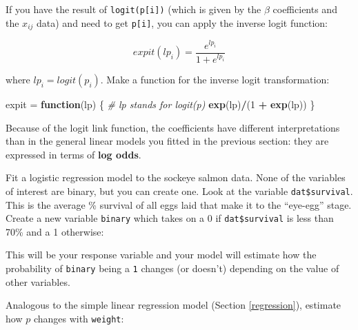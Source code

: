 \documentclass[]{book}
\newenvironment{Shaded}{\begin{snugshade}}{\end{snugshade}}
\newcommand{\KeywordTok}[1]{\textcolor[rgb]{0.13,0.29,0.53}{\textbf{#1}}}
\newcommand{\DecValTok}[1]{\textcolor[rgb]{0.00,0.00,0.81}{#1}}
\newcommand{\StringTok}[1]{\textcolor[rgb]{0.31,0.60,0.02}{#1}}
\newcommand{\CommentTok}[1]{\textcolor[rgb]{0.56,0.35,0.01}{\textit{#1}}}
\newcommand{\ControlFlowTok}[1]{\textcolor[rgb]{0.13,0.29,0.53}{\textbf{#1}}}
\newcommand{\OperatorTok}[1]{\textcolor[rgb]{0.81,0.36,0.00}{\textbf{#1}}}
\newcommand{\NormalTok}[1]{#1}
\theoremstyle{definition}
\theoremstyle{definition}
\theoremstyle{definition}
\theoremstyle{remark}
\begin{document}
If you have the result of \texttt{logit(p{[}i{]})} (which is given by
the \(\beta\) coefficients and the \(x_{ij}\) data) and need to get
\texttt{p{[}i{]}}, you can apply the inverse logit function:

\begin{equation}
  expit(lp_i)=\frac{e^{lp_i}}{1 + e^{lp_i}}
\label{eq:expit}
\end{equation}

where \(lp_i = logit(p_i)\). Make a function for the inverse logit
transformation:

\begin{Shaded}
\begin{Highlighting}[]
\NormalTok{expit =}\StringTok{ }\ControlFlowTok{function}\NormalTok{(lp) \{  }\CommentTok{# lp stands for logit(p)}
  \KeywordTok{exp}\NormalTok{(lp)}\OperatorTok{/}\NormalTok{(}\DecValTok{1} \OperatorTok{+}\StringTok{ }\KeywordTok{exp}\NormalTok{(lp))}
\NormalTok{\}}
\end{Highlighting}
\end{Shaded}

Because of the logit link function, the coefficients have different
interpretations than in the general linear models you fitted in the
previous section: they are expressed in terms of \textbf{log odds}.

Fit a logistic regression model to the sockeye salmon data. None of the
variables of interest are binary, but you can create one. Look at the
variable \texttt{dat\$survival}. This is the average \% survival of all
eggs laid that make it to the ``eye-egg'' stage. Create a new variable
\texttt{binary} which takes on a 0 if \texttt{dat\$survival} is less
than 70\% and a 1 otherwise:

\begin{Shaded}
\end{Shaded}

This will be your response variable and your model will estimate how the
probability of \texttt{binary} being a \texttt{1} changes (or doesn't)
depending on the value of other variables.

Analogous to the simple linear regression model (Section
\ref{regression}), estimate how \(p\) changes with \texttt{weight}:
\end{document}
